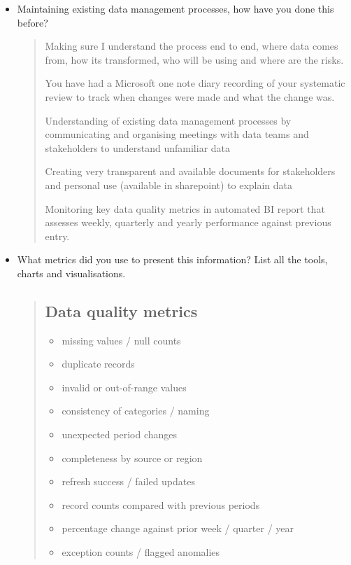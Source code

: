 \documentclass[
  letterpaper,
]{scrbook}
\begin{document}
\begin{itemize}
\item
  Maintaining existing data management processes, how have you done this
  before?

  \begin{quote}
  Making sure I understand the process end to end, where data comes
  from, how its transformed, who will be using and where are the risks.

  You have had a Microsoft one note diary recording of your systematic
  review to track when changes were made and what the change was.

  Understanding of existing data management processes by communicating
  and organising meetings with data teams and stakeholders to understand
  unfamiliar data

  Creating very transparent and available documents for stakeholders and
  personal use (available in sharepoint) to explain data

  Monitoring key data quality metrics in automated BI report that
  assesses weekly, quarterly and yearly performance against previous
  entry.
  \end{quote}
\item
  What metrics did you use to present this information? List all the
  tools, charts and visualisations.

  \begin{quote}
  \subsection{Data quality metrics}\label{data-quality-metrics}

  \begin{itemize}
  \item
    missing values / null counts
  \item
    duplicate records
  \item
    invalid or out-of-range values
  \item
    consistency of categories / naming
  \item
    unexpected period changes
  \item
    completeness by source or region
  \item
    refresh success / failed updates
  \item
    record counts compared with previous periods
  \item
    percentage change against prior week / quarter / year
  \item
    exception counts / flagged anomalies
  \end{itemize}


\end{quote}
\end{itemize}
\end{document}
